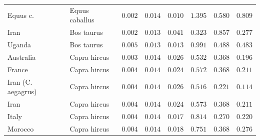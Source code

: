 \documentclass{article}
\begin{document}
\begin{center}
\begin{longtable*}{|l|l|r|r|r|r|r|r|}
            \bottomrule
            \endlastfoot
             Equus c. &      Equus caballus &               $ 0.002$ &              $ 0.014$ &              $ 0.010$ &                                          $ 1.395$ &                         $ 0.580$ &                      $ 0.809$ \\
            Iran &          Bos taurus &               $ 0.002$ &              $ 0.013$ &              $ 0.041$ &                                          $ 0.323$ &                         $ 0.857$ &                      $ 0.277$ \\
            Uganda &          Bos taurus &               $ 0.005$ &              $ 0.013$ &              $ 0.013$ &                                          $ 0.991$ &                         $ 0.488$ &                      $ 0.483$ \\
             Australia &        Capra hircus &               $ 0.003$ &              $ 0.014$ &              $ 0.026$ &                                          $ 0.532$ &                         $ 0.368$ &                      $ 0.196$ \\
             France &        Capra hircus &               $ 0.004$ &              $ 0.014$ &              $ 0.024$ &                                          $ 0.572$ &                         $ 0.368$ &                      $ 0.211$ \\
             Iran (C. aegagrus) &        Capra hircus &               $ 0.004$ &              $ 0.014$ &              $ 0.026$ &                                          $ 0.516$ &                         $ 0.221$ &                      $ 0.114$ \\
             Iran &        Capra hircus &               $ 0.004$ &              $ 0.014$ &              $ 0.024$ &                                          $ 0.573$ &                         $ 0.368$ &                      $ 0.211$ \\
             Italy &        Capra hircus &               $ 0.004$ &              $ 0.014$ &              $ 0.017$ &                                          $ 0.814$ &                         $ 0.270$ &                      $ 0.220$ \\
             Morocco &        Capra hircus &               $ 0.004$ &              $ 0.014$ &              $ 0.018$ &                                          $ 0.751$ &                         $ 0.368$ &                      $ 0.276$ \\

\end{longtable*}
\end{center}
\end{document}
